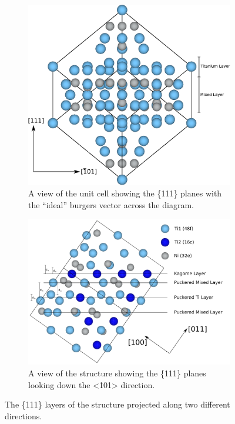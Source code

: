 \begin{figure}
\centering
\begin{subfigure}{0.65\textwidth}
\centering
\includegraphics[width=\textwidth]{Ti2Ni-slip_system}
\caption{A view of the  unit cell showing the \{111\} planes with the ``ideal'' burgers vector across the diagram.\label{fig:slip_system_Ti2Ni}}
\end{subfigure}

\begin{subfigure}{0.65\textwidth}
\centering
\includegraphics[width=\textwidth]{Ti2Ni-layers}
\caption{A view of the  structure showing the \{111\} planes looking down the <\=101> direction.\label{fig:Laves_phase_Ti2Ni_similarity}}
\end{subfigure}
\caption[The \{1\,1\,1\} planes of the  structure.]{The \{111\} layers of the  structure projected along two different directions.\label{fig:Ti2Ni_111_planes}}
\end{figure}

